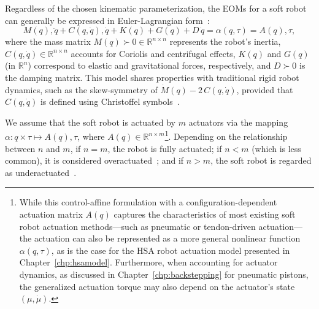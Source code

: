 Regardless of the chosen kinematic parameterization, the \glspl{EOM} for a soft robot can generally be expressed in Euler-Lagrangian form~\citep{della2023model}:
\begin{equation}\label{eq:background:dynamics:eom}
M(q) , \ddot{q} + C(q, \dot{q}) , \dot{q} + K(q) + G(q) + D \, \dot{q} = \alpha(q,\tau) = A(q) , \tau,
\end{equation}
where the mass matrix $M(q) \succ 0 \in \mathbb{R}^{n \times n}$ represents the robot’s inertia, $C(q,\dot{q}) \in \mathbb{R}^{n \times n}$ accounts for Coriolis and centrifugal effects, $K(q)$ and $G(q)$ (in $\mathbb{R}^{n}$) correspond to elastic and gravitational forces, respectively, and $D \succ 0$ is the damping matrix. This model shares properties with traditional rigid robot dynamics, such as the skew-symmetry of $\dot{M}(q) - 2 \, C(q,\dot{q})$, provided that $C(q,\dot{q})$ is defined using Christoffel symbols~\citep{della2020model}.

We assume that the soft robot is actuated by $m$ actuators via the mapping $\alpha: q \times \tau \mapsto A(q) , \tau$, where $A(q) \in \mathbb{R}^{n \times m}$\footnote{While this control-affine formulation with a configuration-dependent actuation matrix $A(q)$ captures the characteristics of most existing soft robot actuation methods—such as pneumatic or tendon-driven actuation—the actuation can also be represented as a more general nonlinear function $\alpha(q,\tau)$, as is the case for the \gls{HSA} robot actuation model presented in Chapter~\ref{chp:hsamodel}. Furthermore, when accounting for actuator dynamics, as discussed in Chapter~\ref{chp:backstepping} for pneumatic pistons, the generalized actuation torque may also depend on the actuator’s state $(\mu,\dot{\mu})$.}. 
Depending on the relationship between $n$ and $m$, if $n=m$, the robot is fully actuated; if $n < m$ (which is less common), it is considered overactuated~\citep{pustina2024input}; and if $n > m$, the soft robot is regarded as underactuated~\citep{pustina2025analysis}.

